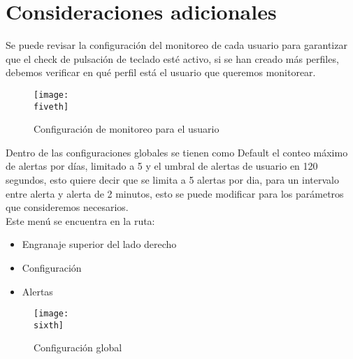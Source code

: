 \documentclass[a4paper]{article}
\newcommand{\fiveth}{img/captura5.png}
\newcommand{\sixth}{img/captura6.png}
\begin{document}
    \section{Consideraciones adicionales}
    Se puede revisar la configuración del monitoreo de cada usuario para garantizar que el check de pulsación de teclado esté activo, si se han creado más perfiles, debemos verificar en qué perfil está el usuario que queremos monitorear.

    \begin{figure}[H] 
        \centering 
        \texttt{[image: \\fiveth]} 
        \caption{Configuración de monitoreo para el usuario}
    \end{figure}
    \clearpage


    Dentro de las configuraciones globales se tienen como Default el conteo máximo de alertas por días, limitado a 5 y el umbral de alertas de usuario en 120 segundos, esto quiere decir que se limita a 5 alertas por dia, para un intervalo entre alerta y alerta de 2 minutos, esto se puede modificar para los parámetros que consideremos necesarios.\\
    Este menú se encuentra en la ruta:

    \begin{itemize}
        \item Engranaje superior del lado derecho 
        \item Configuración
        \item Alertas
    \end{itemize}

    \begin{figure}[H] 
        \centering 
        \texttt{[image: \\sixth]} 
        \caption{Configuración global}
    \end{figure}
\end{document}

